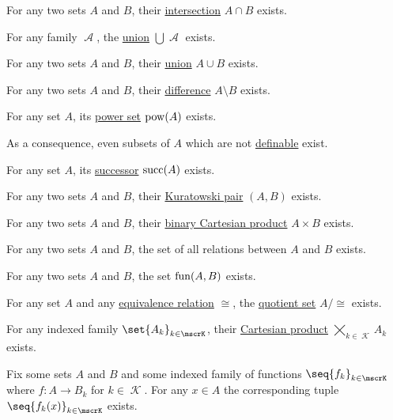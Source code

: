 \begin{proposition}
\begin{thmenum}
     For any two sets \( A \) and \( B \), their \hyperref[def:basic_set_operations/intersection]{intersection} \( A \cap B \) exists.

     For any family \( \mscrA \), the \hyperref[def:basic_set_operations/union]{union} \( \bigcup \mscrA \) exists.

     For any two sets \( A \) and \( B \), their \hyperref[def:basic_set_operations/union]{union} \( A \cup B \) exists.

     For any two sets \( A \) and \( B \), their \hyperref[def:basic_set_operations/difference]{difference} \( A \setminus B \) exists.

     For any set \( A \), its \hyperref[def:basic_set_operations/power_set]{power set} \( \operatorname{pow}(A) \) exists.

    As a consequence, even subsets of \( A \) which are not \hyperref[def:first_order_definability]{definable} exist.

     For any set \( A \), its \hyperref[def:ordinal_successor]{successor} \( \operatorname{succ}(A) \) exists.

     For any two sets \( A \) and \( B \), their \hyperref[def:binary_cartesian_product]{Kuratowski pair} \( (A, B) \) exists.

     For any two sets \( A \) and \( B \), their \hyperref[def:binary_cartesian_product]{binary Cartesian product} \( A \times B \) exists.

     For any two sets \( A \) and \( B \), the set of all relations between \( A \) and \( B \) exists.

     For any two sets \( A \) and \( B \), the set \hyperref[def:function/set_of_functions]{\( \operatorname{fun}(A, B) \)} exists.

     For any set \( A \) and any \hyperref[def:equivalence_relation]{equivalence relation} \( \cong \), the \hyperref[def:equivalence_relation/quotient]{quotient set} \( A / {\cong} \) exists.

     For any indexed family \( \set{ A_k }_{k \in \mscrK} \), their \hyperref[def:cartesian_product]{Cartesian product} \( \bigtimes_{k \in \mscrK} A_k \) exists.

     Fix some sets \( A \) and \( B \) and some indexed family of functions \( \seq{ f_k }_{k \in \mscrK} \) where \( f: A \to B_k \) for \( k \in \mscrK \). For any \( x \in A \) the corresponding tuple \( \seq{ f_k(x) }_{k \in \mscrK} \) exists.
  \end{thmenum}
\end{proposition}
